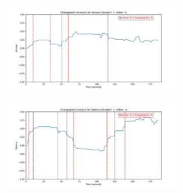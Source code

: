 \documentclass[11pt, letterpaper]{article}
\begin{document}
\begin{figure}
    \centering
    \begin{subfigure}[t]{0.49\textwidth}
        \centering
        \includegraphics[width=\linewidth]{sub_1_changepoints_V1_arousal} 
        \caption{} \label{fig:sub_1_changepoints_V1_arousal}
    \end{subfigure}
    \hfill
    \begin{subfigure}[t]{0.49\textwidth}
        \centering
        \includegraphics[width=\linewidth]{sub_1_changepoints_V1_valence} 
        \caption{} \label{fig:sub_1_changepoints_V1_valence}
    \end{subfigure}

    \vspace{1cm}
    

\end{figure}
\end{document}
